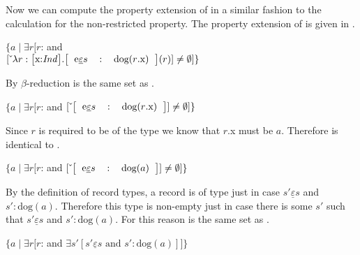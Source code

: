 \begin{shaded}


\end{shaded}


Now we can compute the property extension of
 in a similar fashion to the calculation for the
non-restricted property.   
The property extension of  is given in \nexteg{}.\label{pg:set-reduction-gq}
\begin{ex} 
$\{a\mid\exists
  r[r$: and \\
\hspace*{2em}$\down{\lambda
  r:\text{\smallrecord{\smalltfield{x}{\textit{Ind}}}}
  . \text{\record{\rfield{e}{$s$}{dog($r$.x)}}}(r)} \not=\emptyset]\}$ 
\end{ex} 
By $\beta$-reduction \preveg{} is the same set as \nexteg{}.
\begin{ex} 
$\{a\mid\exists
  r[r$: and 
$\down{\text{\record{\rfield{e}{$s$}{dog($r$.x)}}}} \not=\emptyset]\}$  
\end{ex} 
Since $r$ is required to be of the type
 we know that $r$.x
must be $a$.  Therefore \preveg{} is identical to \nexteg{}.
\begin{ex} 
$\{a\mid\exists
  r[r$: and 
$\down{\text{\record{\rfield{e}{$s$}{dog($a$)}}}} \not=\emptyset]\}$ 
\end{ex} 
By the definition of record types, a record
 is of type
 just in case $s'\underline{\varepsilon}s$ and
$s':\text{dog}(a)$.
Therefore this type is non-empty just in case there is some $s'$ such
that $s'\underline{\varepsilon}s$ and $s':\text{dog}(a)$.
For this reason \preveg{} is the same set as \nexteg{}.
\begin{ex} 
$\{a\mid\exists
  r[r$: and 
$\exists s'[s'\underline{\varepsilon}s \text{ and } s':\text{dog}(a)]]\}$ 
\end{ex}
